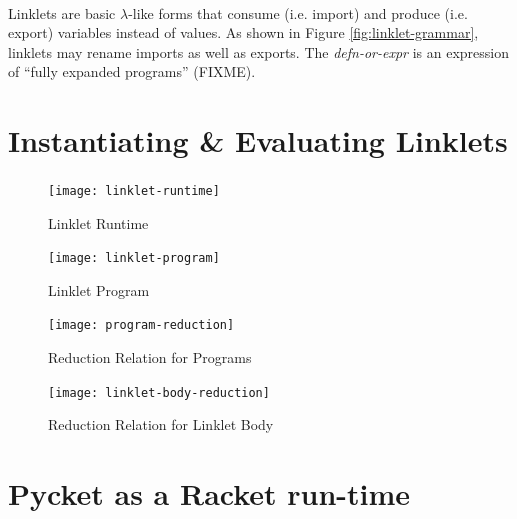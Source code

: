\documentclass[a4paper]{article}
\begin{document}
\paragraph{} Linklets are basic $\lambda$-like forms that consume
(i.e. import) and produce (i.e. export) variables instead of
values. As shown in Figure \ref{fig:linklet-grammar}, linklets may
rename imports as well as exports. The \emph{defn-or-expr} is an
expression of ``fully expanded programs'' (FIXME).

\section{Instantiating \& Evaluating Linklets}

\paragraph{} 

\begin{figure}[h!]
\begin{center}
\texttt{[image: linklet-runtime]}
\caption{Linklet Runtime}
\end{center}
\end{figure}

\begin{figure}[h!]
\begin{center}
\texttt{[image: linklet-program]}
\caption{Linklet Program}
\end{center}
\end{figure}

\begin{figure}[h!]
\begin{center}
\texttt{[image: program-reduction]}
\caption{Reduction Relation for Programs}
\end{center}
\end{figure}

\begin{figure}[h!]
\begin{center}
\texttt{[image: linklet-body-reduction]}
\caption{Reduction Relation for Linklet Body}
\end{center}
\end{figure}


\section{Pycket as a Racket run-time}
\end{document}
